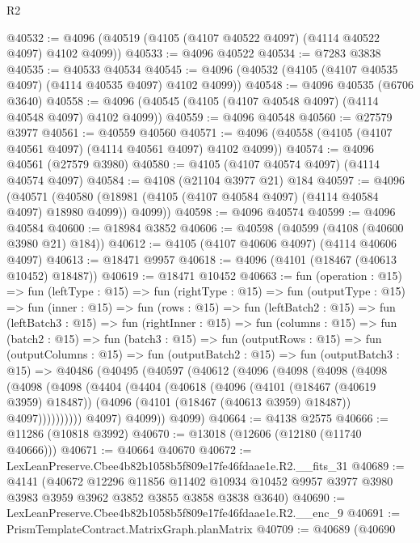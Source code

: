 \begin{lexlean}{R2}
\begin{coremodule}
@40532 := @4096 (@40519 (@4105 (@4107 @40522 @4097) (@4114 @40522 @4097) @4102 @4099))
@40533 := @4096 @40522
@40534 := @7283 @3838
@40535 := @40533 @40534
@40545 := @4096 (@40532 (@4105 (@4107 @40535 @4097) (@4114 @40535 @4097) @4102 @4099))
@40548 := @4096 @40535 (@6706 @3640)
@40558 := @4096 (@40545 (@4105 (@4107 @40548 @4097) (@4114 @40548 @4097) @4102 @4099))
@40559 := @4096 @40548
@40560 := @27579 @3977
@40561 := @40559 @40560
@40571 := @4096 (@40558 (@4105 (@4107 @40561 @4097) (@4114 @40561 @4097) @4102 @4099))
@40574 := @4096 @40561 (@27579 @3980)
@40580 := @4105 (@4107 @40574 @4097) (@4114 @40574 @4097)
@40584 := @4108 (@21104 @3977 @21) @184
@40597 := @4096
    (@40571 (@40580 (@18981 (@4105 (@4107 @40584 @4097) (@4114 @40584 @4097) @18980 @4099)) @4099))
@40598 := @4096 @40574
@40599 := @4096 @40584
@40600 := @18984 @3852
@40606 := @40598 (@40599 (@4108 (@40600 @3980 @21) @184))
@40612 := @4105 (@4107 @40606 @4097) (@4114 @40606 @4097)
@40613 := @18471 @9957
@40618 := @4096 (@4101 (@18467 (@40613 @10452) @18487))
@40619 := @18471 @10452
@40663 := fun (operation : @15) =>
  fun (leftType : @15) =>
  fun (rightType : @15) =>
  fun (outputType : @15) =>
  fun (inner : @15) =>
  fun (rows : @15) =>
  fun (leftBatch2 : @15) =>
  fun (leftBatch3 : @15) =>
  fun (rightInner : @15) =>
  fun (columns : @15) =>
  fun (batch2 : @15) =>
  fun (batch3 : @15) =>
  fun (outputRows : @15) =>
  fun (outputColumns : @15) =>
  fun (outputBatch2 : @15) =>
  fun (outputBatch3 : @15) =>
  @40486
    (@40495
      (@40597
        (@40612
          (@4096
            (@4098
              (@4098
                (@4098
                  (@4098
                    (@4098
                      (@4404
                        (@4404
                          (@40618
                            (@4096
                              (@4101 (@18467 (@40619 @3959) @18487))
                              (@4096 (@4101 (@18467 (@40613 @3959) @18487)) @4097))))))))))
            @4097)
          @4099))
      @4099)
@40664 := @4138 @2575
@40666 := @11286 (@10818 @3992)
@40670 := @13018 (@12606 (@12180 (@11740 @40666)))
@40671 := @40664 @40670
@40672 := LexLeanPreserve.Cbee4b82b1058b5f809e17fe46fdaae1e.R2.__fits_31
@40689 := @4141
    (@40672
      @12296
      @11856
      @11402
      @10934
      @10452
      @9957
      @3977
      @3980
      @3983
      @3959
      @3962
      @3852
      @3855
      @3858
      @3838
      @3640)
@40690 := LexLeanPreserve.Cbee4b82b1058b5f809e17fe46fdaae1e.R2.__enc_9
@40691 := PrismTemplateContract.MatrixGraph.planMatrix
@40709 := @40689
    (@40690

\end{coremodule}
\end{lexlean}
